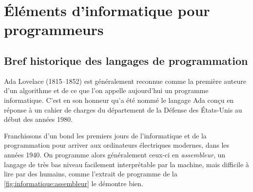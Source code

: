 
\chapter{Éléments d'informatique pour programmeurs}
\label{chap:informatique}


\section{Bref historique des langages de programmation}
\label{sec:informatique:historique}

Ada Lovelace (1815--1852) est généralement reconnue comme la première
auteure d'un algorithme et de ce que l'on appelle aujourd'hui un
programme informatique. C'est en son honneur qu'a été nommé le langage
Ada conçu en réponse à un cahier de charges du département de la
Défense des États-Unis au début des années 1980.

Franchissons d'un bond les premiers jours de l'informatique et de la
programmation pour arriver aux ordinateurs électriques modernes, dans
les années 1940. On programme alors généralement ceux-ci en
\emph{assembleur}, un langage de très bas niveau facilement
interprétable par la machine, mais difficile à lire par des humains,
comme l'extrait de programme de la
\autoref{fig:informatique:assembleur} le démontre bien.

